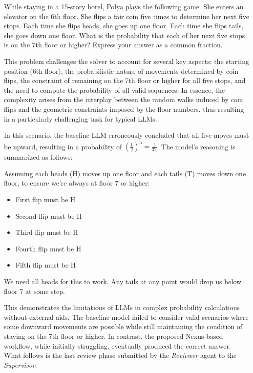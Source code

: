 \begingroup
\renewcommand{\theproblem}{\#25780}
\begin{problem}
    While staying in a 15-story hotel, Polya plays the following game. She enters an elevator on the 6th floor. She flips a fair coin five times to determine her next five stops. Each time she flips heads, she goes up one floor. Each time she flips tails, she goes down one floor. What is the probability that each of her next five stops is on the 7th floor or higher? Express your answer as a common fraction.
\end{problem}
\endgroup

This problem challenges the solver to account for several key aspects: the starting position (6th floor), the probabilistic nature of movements determined by coin flips, the constraint of remaining on the 7th floor or higher for all five stops, and the need to compute the probability of all valid sequences. In essence, the complexity arises from the interplay between the random walks induced by coin flips and the geometric constraints imposed by the floor numbers, thus resulting in a particularly challenging task for typical LLMs.

In this scenario, the baseline LLM erroneously concluded that all five moves must be upward, resulting in a probability of $(\frac{1}{2})^5 = \frac{1}{32}$. The model's reasoning is summarized as follows:

\begin{thinking}
Assuming each heads (H) moves up one floor and each tails (T) moves down one floor, to ensure we're always at floor 7 or higher:
\begin{itemize}
    \item First flip must be H
    \item Second flip must be H
    \item Third flip must be H
    \item Fourth flip must be H
    \item Fifth flip must be H
\end{itemize}
We need all heads for this to work. Any tails at any point would drop us below floor 7 at some step.
\end{thinking}

This demonstrates the limitations of LLMs in complex probability calculations without external aids. The baseline model failed to consider valid scenarios where some downward movements are possible while still maintaining the condition of staying on the 7th floor or higher. In contrast, the proposed Nexus-based workflow, while initially struggling, eventually produced the correct answer. What follows is the last review phase submitted by the {\em Reviewer} agent to the {\em Supervisor}:

